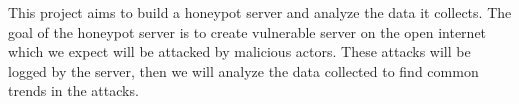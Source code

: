 This project aims to build a honeypot server and analyze the data it collects. The goal of the honeypot server is to create vulnerable server on the open internet which we expect will be attacked by malicious actors. These attacks will be logged by the server, then we will analyze the data collected to find common trends in the attacks. 
